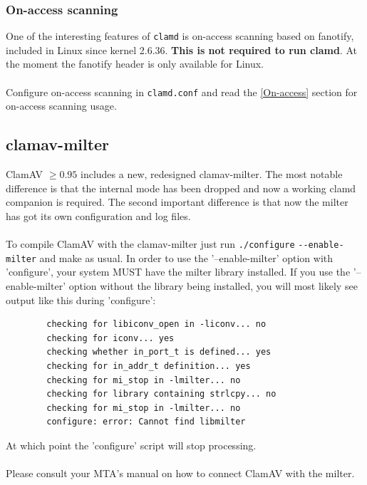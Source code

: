 \documentclass[a4paper,titlepage,12pt]{article}
\begin{document}
    \subsubsection{On-access scanning}
    One of the interesting features of \verb+clamd+ is on-access scanning
    based on fanotify, included in Linux since kernel 2.6.36.
    \textbf{This is not required to run clamd}. At the moment the fanotify header is
    only available for Linux.
    \\\\
    Configure on-access scanning in \verb+clamd.conf+ and read the 
    \ref{On-access} section for on-access scanning usage.

    \subsection{clamav-milter}\label{sec:clamavmilter}
    ClamAV $\ge0.95$ includes a new, redesigned clamav-milter. The most notable
    difference is that the internal mode has been dropped and now a working
    clamd companion is required. The second important difference is that now
    the milter has got its own configuration and log files. 
    \\\\
    To compile ClamAV with the clamav-milter just run \verb+./configure+
    \verb+--enable-milter+ and make as usual. In order to use the 
    '--enable-milter' option with 'configure', your system MUST have the milter 
    library installed.  If you use the '--enable-milter' option without the 
    library being installed, you will most likely see output like this during 
    'configure':
    \begin{verbatim}
        checking for libiconv_open in -liconv... no
        checking for iconv... yes
        checking whether in_port_t is defined... yes
        checking for in_addr_t definition... yes
        checking for mi_stop in -lmilter... no
        checking for library containing strlcpy... no
        checking for mi_stop in -lmilter... no
        configure: error: Cannot find libmilter
    \end{verbatim}
    At which point the 'configure' script will stop processing.
    \\\\
    Please consult your MTA's manual on how to connect ClamAV with the milter.
\end{document}
